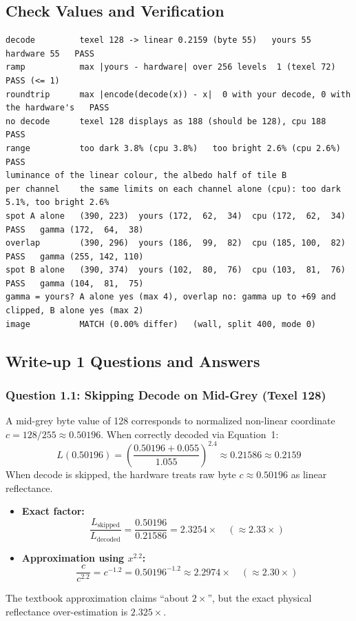 \documentclass[10pt,a4paper]{article}
\begin{document}
\subsection{Check Values and Verification}
\begin{lstlisting}[caption={Automated Verification Output for Part I (make srgb)}]
decode         texel 128 -> linear 0.2159 (byte 55)   yours 55   hardware 55   PASS
ramp           max |yours - hardware| over 256 levels  1 (texel 72)   PASS (<= 1)
roundtrip      max |encode(decode(x)) - x|  0 with your decode, 0 with the hardware's   PASS
no decode      texel 128 displays as 188 (should be 128), cpu 188   PASS
range          too dark 3.8% (cpu 3.8%)   too bright 2.6% (cpu 2.6%)   PASS
luminance of the linear colour, the albedo half of tile B
per channel    the same limits on each channel alone (cpu): too dark 5.1%, too bright 2.6%
spot A alone   (390, 223)  yours (172,  62,  34)  cpu (172,  62,  34)  PASS   gamma (172,  64,  38)
overlap        (390, 296)  yours (186,  99,  82)  cpu (185, 100,  82)  PASS   gamma (255, 142, 110)
spot B alone   (390, 374)  yours (102,  80,  76)  cpu (103,  81,  76)  PASS   gamma (104,  81,  75)
gamma = yours? A alone yes (max 4), overlap no: gamma up to +69 and clipped, B alone yes (max 2)
image          MATCH (0.00% differ)   (wall, split 400, mode 0)
\end{lstlisting}

\subsection{Write-up 1 Questions and Answers}

\subsubsection*{Question 1.1: Skipping Decode on Mid-Grey (Texel 128)}
A mid-grey byte value of 128 corresponds to normalized non-linear coordinate $c = 128/255 \approx 0.50196$. When correctly decoded via Equation~1:
\[
L(0.50196) = \left(\frac{0.50196 + 0.055}{1.055}\right)^{2.4} \approx 0.21586 \approx 0.2159
\]
When decode is skipped, the hardware treats raw byte $c \approx 0.50196$ as linear reflectance.
\begin{itemize}
    \item \textbf{Exact factor:}
    \[
    \frac{L_{\text{skipped}}}{L_{\text{decoded}}} = \frac{0.50196}{0.21586} = \mathbf{2.3254\times} \quad (\approx 2.33\times)
    \]
    \item \textbf{Approximation using $x^{2.2}$:}
    \[
    \frac{c}{c^{2.2}} = c^{-1.2} = 0.50196^{-1.2} \approx \mathbf{2.2974\times} \quad (\approx 2.30\times)
    \]
\end{itemize}
The textbook approximation claims ``about $2\times$'', but the exact physical reflectance over-estimation is $2.325\times$.
\end{document}
